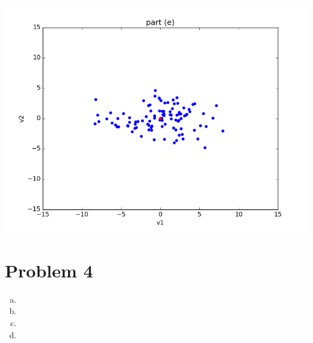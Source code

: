 \documentclass{article}
\begin{document}
\begin{enumerate}[a)]
    \begin{center}
      \includegraphics[scale=0.5]{prob3e}
    \end{center}

\end{enumerate}


\section*{Problem 4}
\begin{enumerate}[a)]
  \item
  \item
  \item
  \item
\end{enumerate}
\end{document}

